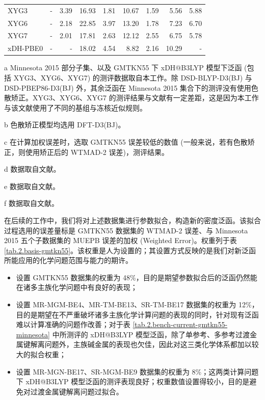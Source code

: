 \begin{table}
{\begin{tabular}{ld{1.3}d{1.3}d{2.2}d{2.2}d{2.2}d{2.2}d{2.2}d{2.2}}
  XYG3            
  & -               & 3.39 & 16.93      & 1.81        & 10.67      & 1.59       & 5.56       & 5.88     \\
  XYG6            
  & -               & 2.18 & 22.85      & 3.97        & 13.20      & 1.78       & 7.23       & 6.70     \\
  XYG7            
  & -               & 2.01 & 17.81      & 2.63        & 12.12      & 2.55       & 6.75       & 5.78     \\
  xDH-PBE0        
  & -               & -               & 18.02      & 4.54        & 8.82       & 2.16       & 10.29      & -        \\
  \bottomrule
  \end{tabular}
}{
  \item[a] Minnesota 2015 部分子集、以及 GMTKN55 下 xDH@B3LYP 模型下泛函 (包括 XYG3、XYG6、XYG7) 的测评数据取自本工作。除 DSD-BLYP-D3(BJ) 与 DSD-PBEP86-D3(BJ) 外，其余泛函在 Minnesota 2015 集合下的测评没有使用色散矫正。XYG3、XYG6、XYG7 的测评结果与文献\cite{Zhang-Xu.JPCL.2021}有一定差距，这是因为本工作与该文献使用了不同的基组与冻核近似规则。
  \item[b] 色散矫正模型均选用 DFT-D3(BJ)。
  \item[c] 在计算加权误差时，选取 GMTKN55 误差较低的数值 (一般来说，若有色散矫正，则使用矫正后的 WTMAD-2 误差)，测评结果。
  \item[d] 数据取自文献\cite{Goerigk-Grimme.PCCP.2017}。
  \item[e] 数据取自文献\cite{Mehta-Goerigk.PCCP.2018}。
  \item[f] 数据取自文献\cite{Santra-Martin.JPCA.2019}。
}
\end{table}

在后续的工作中，我们将对上述数据集进行参数拟合，构造新的密度泛函。该拟合过程选用的误差量标是 GMTKN55 数据集的 WTMAD-2 误差、与 Minnesota 2015 五个子数据集的 MUEPB 误差的加权 (Weighted Error)。权重列于表 \ref{tab.2.basis-gmtkn55}。该权重是人为设置的；其设置方式反映的是我们对新泛函所能应用的化学问题范围与能力的期许。
\begin{itemize}[nosep]
  \item 设置 GMTKN55 数据集的权重为 48\%，目的是期望参数拟合后的泛函仍然能在诸多主族化学问题中有良好的表现；
  \item 设置 MR-MGM-BE4、MR-TM-BE13、SR-TM-BE17 数据集的权重为 12\%，目的是期望在不严重破坏诸多主族化学计算问题的表现的同时，针对现有泛函难以计算准确的问题作改善；对于表 \ref{tab.2.bench-current-gmtkn55-minnesota} 中所测评的 xDH@B3LYP 模型泛函，除了单参考、多参考过渡金属键解离问题外，主族碱金属的表现也欠佳，因此对这三类化学体系都加以较大的拟合权重；
  \item 设置 MR-MGN-BE17、SR-MGM-BE9 数据集的权重为 8\%；这两类计算问题下 xDH@B3LYP 模型泛函的测评表现良好；权重数值设置得较小，目的是避免对过渡金属键解离问题过拟合。
\end{itemize}

